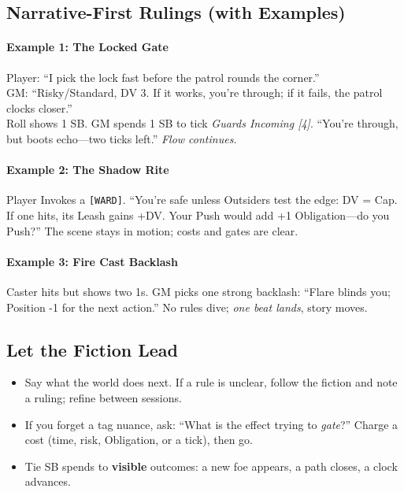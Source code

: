 \subsection{Narrative-First Rulings (with Examples)}
\paragraph{Example 1: The Locked Gate}
Player: ``I pick the lock fast before the patrol rounds the corner.''\\
GM: ``Risky/Standard, DV 3. If it works, you’re through; if it fails, the patrol clocks closer.''\\
Roll shows 1 SB. GM spends 1 SB to tick \emph{Guards Incoming [4]}. ``You’re through, but boots echo—two ticks left.'' \emph{Flow continues.}

\paragraph{Example 2: The Shadow Rite}
Player Invokes a \texttt{[WARD]}. ``You’re safe unless Outsiders test the edge: DV = Cap. If one hits, its Leash gains +DV. Your Push would add +1 Obligation—do you Push?'' The scene stays in motion; costs and gates are clear.

\paragraph{Example 3: Fire Cast Backlash}
Caster hits but shows two 1s. GM picks one strong backlash: ``Flare blinds you; Position -1 for the next action.'' No rules dive; \emph{one beat lands}, story moves.

\subsection{Let the Fiction Lead}
\begin{itemize}
  \item Say what the world does next. If a rule is unclear, follow the fiction and note a ruling; refine between sessions.
  \item If you forget a tag nuance, ask: ``What is the effect trying to \emph{gate}?'' Charge a cost (time, risk, Obligation, or a tick), then go.
  \item Tie SB spends to \textbf{visible} outcomes: a new foe appears, a path closes, a clock advances.
\end{itemize}

